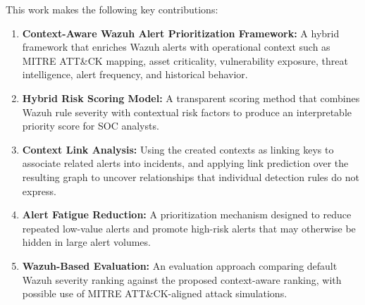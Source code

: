\documentclass[10pt,letterpaper]{article}
\begin{document}
This work makes the following key contributions:

\begin{enumerate}
\item \textbf{Context-Aware Wazuh Alert Prioritization Framework:} A hybrid framework that enriches Wazuh alerts with operational context such as MITRE ATT\&CK mapping, asset criticality, vulnerability exposure, threat intelligence, alert frequency, and historical behavior.

\item \textbf{Hybrid Risk Scoring Model:} A transparent scoring method that combines Wazuh rule severity with contextual risk factors to produce an interpretable priority score for SOC analysts.

\item \textbf{Context Link Analysis:} Using the created contexts as linking keys to associate related alerts into incidents, and applying link prediction over the resulting graph to uncover relationships that individual detection rules do not express.

\item \textbf{Alert Fatigue Reduction:} A prioritization mechanism designed to reduce repeated low-value alerts and promote high-risk alerts that may otherwise be hidden in large alert volumes.

\item \textbf{Wazuh-Based Evaluation:} An evaluation approach comparing default Wazuh severity ranking against the proposed context-aware ranking, with possible use of MITRE ATT\&CK-aligned attack simulations.
\end{enumerate}
\end{document}
